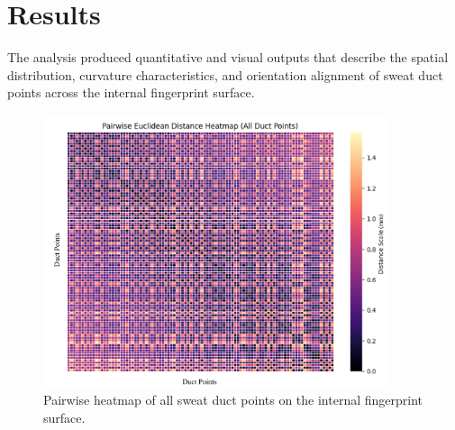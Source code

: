 \chapter{Results}

The analysis produced quantitative and visual outputs that describe the spatial distribution, curvature characteristics, and orientation alignment of sweat duct points across the internal fingerprint surface.
\begin{figure}[h!]
    \centering
    \includegraphics[width=0.9\textwidth]{images/pairwise-heatmap.png}
    \caption{Pairwise heatmap of all sweat duct points on the internal fingerprint surface.}
    \label{fig:pairwise_heatmap}
\end{figure}

